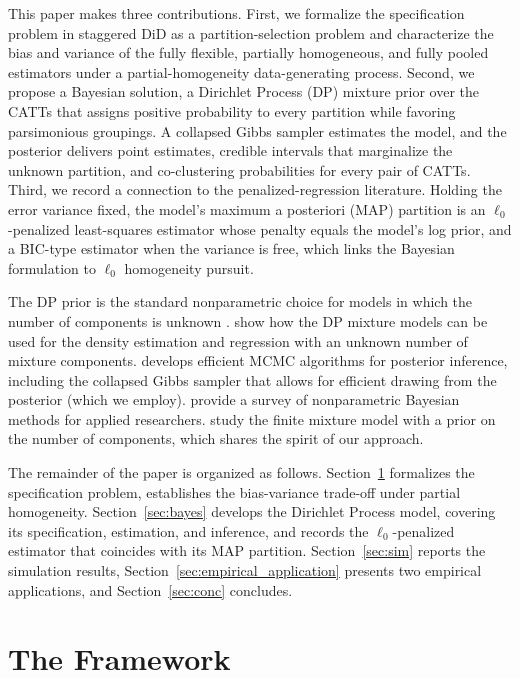 \documentclass[margin=5in, 12pt]{article}
\newcommand{\1}{\mathbbm{1}}
\begin{document}
This paper makes three contributions. First, we formalize the specification problem in staggered DiD as a partition-selection problem and characterize the bias and variance of the fully flexible, partially homogeneous, and fully pooled estimators under a partial-homogeneity data-generating process. Second, we propose a Bayesian solution, a Dirichlet Process (DP) mixture prior over the CATTs that assigns positive probability to every partition while favoring parsimonious groupings. A collapsed Gibbs sampler estimates the model, and the posterior delivers point estimates, credible intervals that marginalize the unknown partition, and co-clustering probabilities for every pair of CATTs. Third, we record a connection to the penalized-regression literature. Holding the error variance fixed, the model's maximum a posteriori (MAP) partition is an $\ell_0$-penalized least-squares estimator whose penalty equals the model's log prior, and a BIC-type estimator when the variance is free, which links the Bayesian formulation to $\ell_0$ homogeneity pursuit.

The DP prior is the standard nonparametric choice for models in which the number of components is unknown \citep{ferguson1973, antoniak1974}. \citet{escobar1995} show how the DP mixture models can be used for the density estimation and regression with an unknown number of mixture components. \citet{neal2000} develops efficient MCMC algorithms for posterior inference,
including the collapsed Gibbs sampler that allows for efficient drawing from the posterior (which we employ). \citet{muller2004} provide
a survey of nonparametric Bayesian methods for applied researchers. \citet{miller2018} study the finite mixture model with a prior on the number of components, which shares the spirit of our approach.

The remainder of the paper is organized as follows. Section~\ref{sec:problem} formalizes the specification problem, establishes the bias-variance trade-off under partial homogeneity.
Section~\ref{sec:bayes} develops the Dirichlet Process model, covering its specification, estimation, and inference, and records the $\ell_0$-penalized estimator that coincides with its MAP partition.
Section~\ref{sec:sim} reports the simulation results, Section~\ref{sec:empirical_application} presents two empirical applications, and Section~\ref{sec:conc} concludes.
\section{The Framework}
\label{sec:problem}
\end{document}
